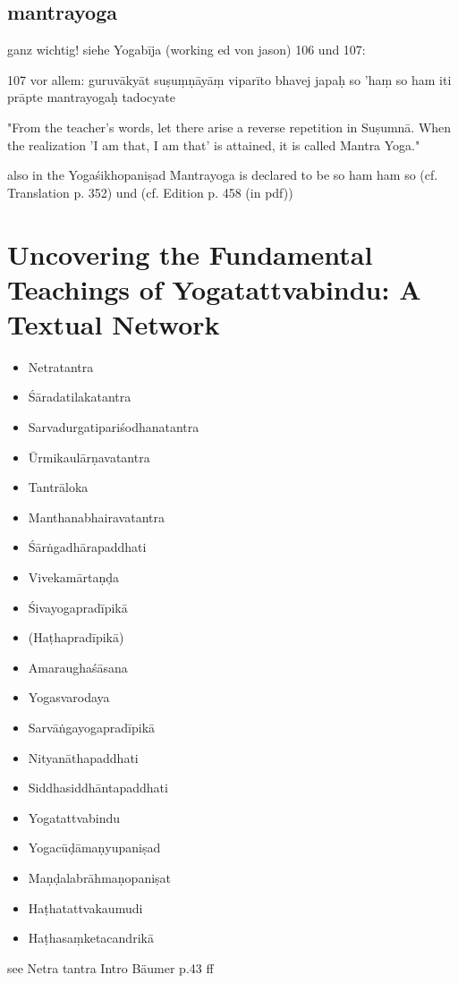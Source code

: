 \section{mantrayoga}

ganz wichtig! siehe Yogabīja (working ed von jason) 106 und 107:

107 vor allem: guruvākyāt suṣuṃṇāyāṃ viparīto bhavej japaḥ
so 'haṃ so ham iti prāpte mantrayogaḥ tadocyate

"From the teacher's words, let there arise a reverse repetition in Suṣumnā. When the realization 'I am that, I am that' is attained, it is called Mantra Yoga."


also in the Yogaśikhopaniṣad Mantrayoga is declared to be so ham ham so (cf. Translation p. 352) und (cf. Edition p. 458 (in pdf)) 
\chapter{Uncovering the Fundamental Teachings of Yogatattvabindu: A Textual Network}

\begin{itemize}
\item Netratantra
\item Śāradatilakatantra
\item Sarvadurgatipariśodhanatantra
\item Ūrmikaulārṇavatantra
\item Tantrāloka
\item Manthanabhairavatantra
\item Śārṅgadhārapaddhati 
\item Vivekamārtaṇḍa
\item Śivayogapradīpikā
\item (Haṭhapradīpikā)
\item Amaraughaśāsana
\item Yogasvarodaya
\item Sarvāṅgayogapradīpikā
\item Nityanāthapaddhati  
\item Siddhasiddhāntapaddhati
\item Yogatattvabindu 
\item Yogacūḍāmaṇyupaniṣad
\item Maṇḍalabrāhmaṇopaniṣat
\item Haṭhatattvakaumudi
\item Haṭhasaṃketacandrikā
\end{itemize}

see Netra tantra Intro Bäumer p.43 ff


